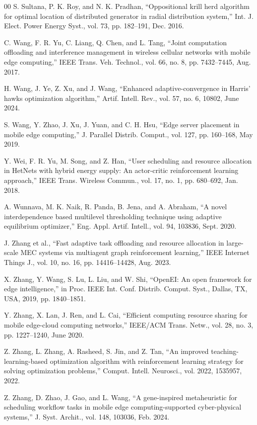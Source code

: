 \documentclass[conference]{IEEEtran}
\begin{document}
\begin{thebibliography}{00}
 S. Sultana, P. K. Roy, and N. K. Pradhan, ``Oppositional krill herd algorithm for optimal location of distributed generator in radial distribution system,'' Int. J. Elect. Power Energy Syst., vol. 73, pp. 182--191, Dec. 2016.

 C. Wang, F. R. Yu, C. Liang, Q. Chen, and L. Tang, ``Joint computation offloading and interference management in wireless cellular networks with mobile edge computing,'' IEEE Trans. Veh. Technol., vol. 66, no. 8, pp. 7432--7445, Aug. 2017.

 H. Wang, J. Ye, Z. Xu, and J. Wang, ``Enhanced adaptive-convergence in Harris' hawks optimization algorithm,'' Artif. Intell. Rev., vol. 57, no. 6, 10802, June 2024.

 S. Wang, Y. Zhao, J. Xu, J. Yuan, and C. H. Hsu, ``Edge server placement in mobile edge computing,'' J. Parallel Distrib. Comput., vol. 127, pp. 160--168, May 2019.

 Y. Wei, F. R. Yu, M. Song, and Z. Han, ``User scheduling and resource allocation in HetNets with hybrid energy supply: An actor-critic reinforcement learning approach,'' IEEE Trans. Wireless Commun., vol. 17, no. 1, pp. 680--692, Jan. 2018.

 A. Wunnava, M. K. Naik, R. Panda, B. Jena, and A. Abraham, ``A novel interdependence based multilevel thresholding technique using adaptive equilibrium optimizer,'' Eng. Appl. Artif. Intell., vol. 94, 103836, Sept. 2020.

 J. Zhang et al., ``Fast adaptive task offloading and resource allocation in large-scale MEC systems via multiagent graph reinforcement learning,'' IEEE Internet Things J., vol. 10, no. 16, pp. 14416--14428, Aug. 2023.

 X. Zhang, Y. Wang, S. Lu, L. Liu, and W. Shi, ``OpenEI: An open framework for edge intelligence,'' in Proc. IEEE Int. Conf. Distrib. Comput. Syst., Dallas, TX, USA, 2019, pp. 1840--1851.

 Y. Zhang, X. Lan, J. Ren, and L. Cai, ``Efficient computing resource sharing for mobile edge-cloud computing networks,'' IEEE/ACM Trans. Netw., vol. 28, no. 3, pp. 1227--1240, June 2020.

 Z. Zhang, L. Zhang, A. Rasheed, S. Jin, and Z. Tan, ``An improved teaching-learning-based optimization algorithm with reinforcement learning strategy for solving optimization problems,'' Comput. Intell. Neurosci., vol. 2022, 1535957, 2022.

 Z. Zhang, D. Zhao, J. Gao, and L. Wang, ``A gene-inspired metaheuristic for scheduling workflow tasks in mobile edge computing-supported cyber-physical systems,'' J. Syst. Archit., vol. 148, 103036, Feb. 2024.
\end{thebibliography}
\end{document}
